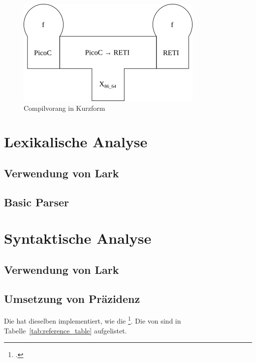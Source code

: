 \begin{figure}[H]
  \centering
  \includegraphics[width=0.33\linewidth]{./figures/summarized_passes.png}
  \caption{Compilvorang in Kurzform}
\end{figure}

\section{Lexikalische Analyse}
\subsection{Verwendung von Lark}
\subsection{Basic Parser}
\section{Syntaktische Analyse}
\subsection{Verwendung von Lark}
\subsection{Umsetzung von Präzidenz}
Die  hat dieselben  implementiert, wie die  \footcite{noauthor_c_nodate}. Die  von  sind in Tabelle~\ref{tab:reference_table} aufgelistet.

